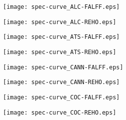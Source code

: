 \documentclass{article}
\begin{document}
\texttt{[image: spec-curve\_ALC-FALFF.eps]}

\texttt{[image: spec-curve\_ALC-REHO.eps]}

\texttt{[image: spec-curve\_ATS-FALFF.eps]}

\texttt{[image: spec-curve\_ATS-REHO.eps]}

\texttt{[image: spec-curve\_CANN-FALFF.eps]}

\texttt{[image: spec-curve\_CANN-REHO.eps]}

\texttt{[image: spec-curve\_COC-FALFF.eps]}

\texttt{[image: spec-curve\_COC-REHO.eps]}
\end{document}
